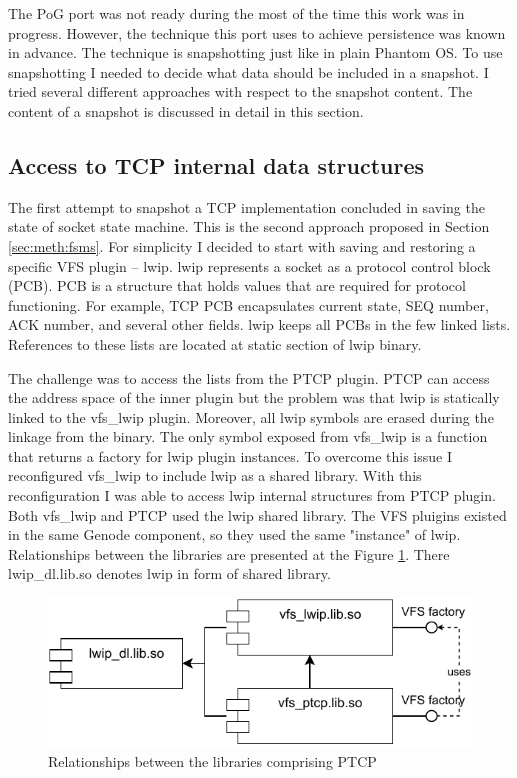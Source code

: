 The PoG port was not ready during the most of the time this work was in
progress. However, the technique this port uses to achieve persistence was
known in advance. The technique is snapshotting just like in plain Phantom OS.
To use snapshotting I needed to decide what data should be included in a
snapshot. I tried several different approaches with respect to the snapshot
content. The content of a snapshot is discussed in detail in this section.

\subsection{Access to TCP internal data structures}

The first attempt to snapshot a TCP implementation concluded in saving the
state of socket state machine. This is the second approach proposed in Section
\ref{sec:meth:fsms}. For simplicity I decided to start with saving and
restoring a specific VFS plugin -- lwip. lwip represents a socket as a protocol
control block (PCB). PCB is a structure that holds values that are required for
protocol functioning. For example, TCP PCB encapsulates current state, SEQ
number, ACK number, and several other fields. lwip keeps all PCBs in the few
linked lists. References to these lists are located at static section of lwip
binary.

The challenge was to access the lists from the PTCP plugin. PTCP can access the
address space of the inner plugin but the problem was that lwip is statically
linked to the vfs\_lwip plugin. Moreover, all lwip symbols are erased during
the linkage from the binary. The only symbol exposed from vfs\_lwip is a
function that returns a factory for lwip plugin instances. To overcome this
issue I reconfigured vfs\_lwip to include lwip as a shared library. With this
reconfiguration I was able to access lwip internal structures from PTCP plugin.
Both vfs\_lwip and PTCP used the lwip shared library. The VFS pluigins existed
in the same Genode component, so they used the same "instance" of lwip.
Relationships between the libraries are presented at the Figure
\ref{fig:lib_deps}. There lwip\_dl.lib.so denotes lwip in form of shared
library.

\begin{figure}
    \centering
    \includegraphics[]{figs/ptcp_libs.pdf}
    \caption{Relationships between the libraries comprising PTCP}
    \label{fig:lib_deps}
\end{figure}

